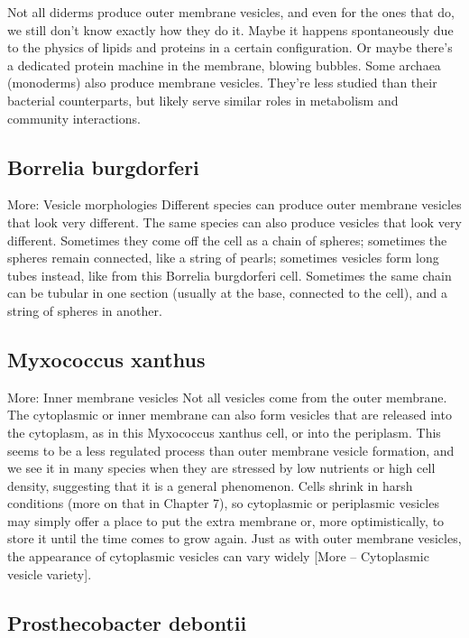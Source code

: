 \documentclass[]{tufte-book}
\begin{document}
Not all diderms produce outer membrane vesicles, and even for the ones
that do, we still don't know exactly how they do it. Maybe it happens
spontaneously due to the physics of lipids and proteins in a certain
configuration. Or maybe there's a dedicated protein machine in the
membrane, blowing bubbles. Some archaea (monoderms) also produce
membrane vesicles. They're less studied than their bacterial
counterparts, but likely serve similar roles in metabolism and community
interactions.

\subsection{Borrelia burgdorferi}\label{borrelia-burgdorferi-1}

More: Vesicle morphologies Different species can produce outer membrane
vesicles that look very different. The same species can also produce
vesicles that look very different. Sometimes they come off the cell as a
chain of spheres; sometimes the spheres remain connected, like a string
of pearls; sometimes vesicles form long tubes instead, like from this
Borrelia burgdorferi cell. Sometimes the same chain can be tubular in
one section (usually at the base, connected to the cell), and a string
of spheres in another.

\subsection{Myxococcus xanthus}\label{myxococcus-xanthus}

More: Inner membrane vesicles Not all vesicles come from the outer
membrane. The cytoplasmic or inner membrane can also form vesicles that
are released into the cytoplasm, as in this Myxococcus xanthus cell, or
into the periplasm. This seems to be a less regulated process than outer
membrane vesicle formation, and we see it in many species when they are
stressed by low nutrients or high cell density, suggesting that it is a
general phenomenon. Cells shrink in harsh conditions (more on that in
Chapter 7), so cytoplasmic or periplasmic vesicles may simply offer a
place to put the extra membrane or, more optimistically, to store it
until the time comes to grow again. Just as with outer membrane
vesicles, the appearance of cytoplasmic vesicles can vary widely {[}More
-- Cytoplasmic vesicle variety{]}.

\subsection{Prosthecobacter debontii}\label{prosthecobacter-debontii}
\end{document}
